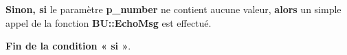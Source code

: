\documentclass[a4paper,10pt]{article}
\begin{document}
\begin{justify}
    \textbf{\color{cond}Sinon, si} le paramètre \textbf{\color{vars}p\_number} ne contient aucune valeur, \textbf{\color{cond}alors} un simple appel de la fonction \textbf{\color{func}BU::EchoMsg} est effectué.
\end{justify}

\begin{justify}
    \textbf{\color{cond}Fin de la condition « si »}.
\end{justify}
\end{document}
